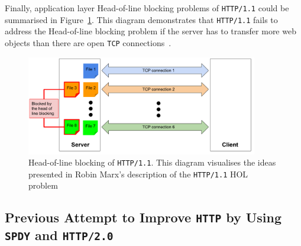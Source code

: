\documentclass[12pt,a4paper]{report}
\begin{document}
Finally, application layer Head-of-line blocking problems of \texttt{HTTP/1.1} could be summarised in Figure~\ref{fig:Head_of_line_blocking_of_HTTP1_1}.
This diagram demonstrates that \texttt{HTTP/1.1} fails to address the Head-of-line blocking problem if the server has to transfer more web objects than there are open \texttt{TCP} connections~\cite{head-of-line-blocking-in-quic-and-http-3-the-details}.

    \begin{figure}[htbp]
    \centering
    \includegraphics[width=0.9\textwidth]{figs/Head_of_line_blocking_of_HTTP1_1.png}
    \caption[Head-of-line blocking of \texttt{HTTP/1.1}]{Head-of-line blocking of \texttt{HTTP/1.1}. This diagram visualises the ideas presented in Robin Marx's description of the \texttt{HTTP/1.1} HOL problem~\cite{head-of-line-blocking-in-quic-and-http-3-the-details}}
    \label{fig:Head_of_line_blocking_of_HTTP1_1}
    \end{figure}





\subsection{Previous Attempt to Improve \texttt{HTTP} by Using \texttt{SPDY} and \texttt{HTTP/2.0}} \label{Previous_attempt_to_improve_http_by_using_SPDY_and_HTTP2}
\end{document}
